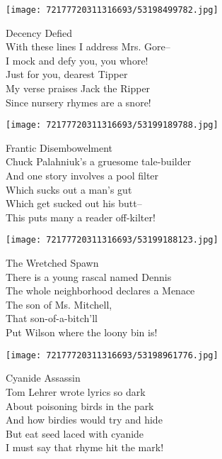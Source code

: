 \documentclass[10pt,letterpaper]{article}
\begin{document}
\begin{center}\texttt{[image: 72177720311316693/53198499782.jpg]}
\end{center}
\begin{center}
Decency Defied\\
\vskip 0.2in
With these lines I address Mrs. Gore--\\
I mock and defy you, you whore!\\
Just for you, dearest Tipper\\
My verse praises Jack the Ripper\\
Since nursery rhymes are a snore!\\
\end{center}
\pagebreak

\begin{center}\texttt{[image: 72177720311316693/53199189788.jpg]}
\end{center}
\begin{center}
Frantic Disembowelment\\
\vskip 0.2in
Chuck Palahniuk's a gruesome tale-builder\\
And one story involves a pool filter\\
Which sucks out a man's gut\\
Which get sucked out his butt--\\
This puts many a reader off-kilter!\\
\end{center}
\pagebreak

\begin{center}
\texttt{[image: 72177720311316693/53199188123.jpg]}
\end{center}

\begin{center}
The Wretched Spawn\\
\vskip 0.2in
There is a young rascal named Dennis\\
The whole neighborhood declares a Menace\\
The son of Ms. Mitchell,\\
That son-of-a-bitch'll\\
Put Wilson where the loony bin is!\\
\end{center}
\pagebreak

\begin{center}\texttt{[image: 72177720311316693/53198961776.jpg]}
\end{center}
\begin{center}
Cyanide Assassin\\
\vskip 0.2in
Tom Lehrer wrote lyrics so dark\\
About poisoning birds in the park\\
And how birdies would try and hide\\
But eat seed laced with cyanide\\
I must say that rhyme hit the mark!\\
\end{center}
\pagebreak
\end{document}
